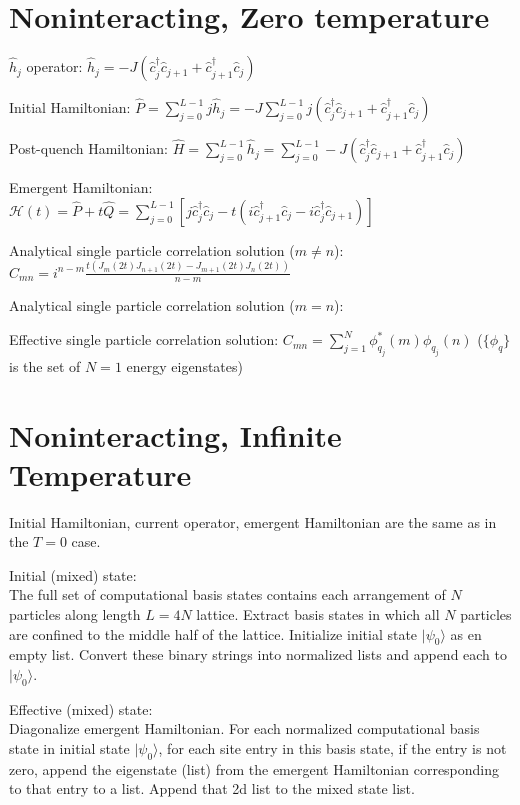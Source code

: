 \documentclass{myclass}
\begin{document}
\section*{Noninteracting, Zero temperature}

$\hat{h}_j$ operator: $\hat{h}_j = -J(\hat{c}^\dag_j \hat{c}_{j+1} + \hat{c}^\dag_{j+1} \hat{c}_{j})$

Initial Hamiltonian: $\hat{P} = \sum \limits_{j=0}^{L-1} j \hat{h}_j = -J \sum \limits_{j=0}^{L-1} j (\hat{c}^\dag_j \hat{c}_{j+1} + \hat{c}^\dag_{j+1} \hat{c}_{j})$

Post-quench Hamiltonian: $\hat{H} = \sum \limits_{j=0}^{L-1} \hat{h}_j = \sum \limits_{j=0}^{L-1} -J(\hat{c}^\dag_j \hat{c}_{j+1} + \hat{c}^\dag_{j+1} \hat{c}_{j})$


Emergent Hamiltonian: $\mathcal{H}(t) = \hat{P} + t \hat{Q} = \sum \limits_{j = 0}^{L-1} \left[ j \hat{c}^\dag_j \hat{c}_j 
- t (i \hat{c}^\dag_{j+1} \hat{c}_j - i \hat{c}^\dag_{j} \hat{c}_{j+1} ) \right]$


Analytical single particle correlation solution ($m \neq n$): $C_{mn}  = i^{n-m} \frac{t(J_m(2t) J_{n+1}(2t) - J_{m+1}(2t) J_n(2t))}{n-m}$

Analytical single particle correlation solution ($m = n$):

Effective single particle correlation solution: $C_{mn} = \sum \limits_{j = 1}^N \phi^\ast_{q_j} (m) \phi_{q_j}(n)$ \hspace{5mm}
($\{\phi_q\}$ is the set of $N=1$ energy eigenstates)



\section*{Noninteracting, Infinite Temperature}

Initial Hamiltonian, current operator, emergent Hamiltonian are the same as in the $T=0$ case.

Initial (mixed) state: \\
The full set of computational basis states contains each arrangement of $N$ particles along length $L = 4N$ lattice. 
Extract basis states in which all $N$ particles are confined to the middle half of the lattice. 
Initialize initial state $|\psi_0\rangle$ as en empty list. 
Convert these binary strings into normalized lists and append each to $|\psi_0 \rangle$.

Effective (mixed) state: \\
Diagonalize emergent Hamiltonian.
For each normalized computational basis state in initial state $|\psi_0 \rangle$,
	for each site entry in this basis state, if the entry is not zero, append the eigenstate (list) from the emergent Hamiltonian corresponding to that entry to a list.
	Append that 2d list to the mixed state list.
\end{document}
